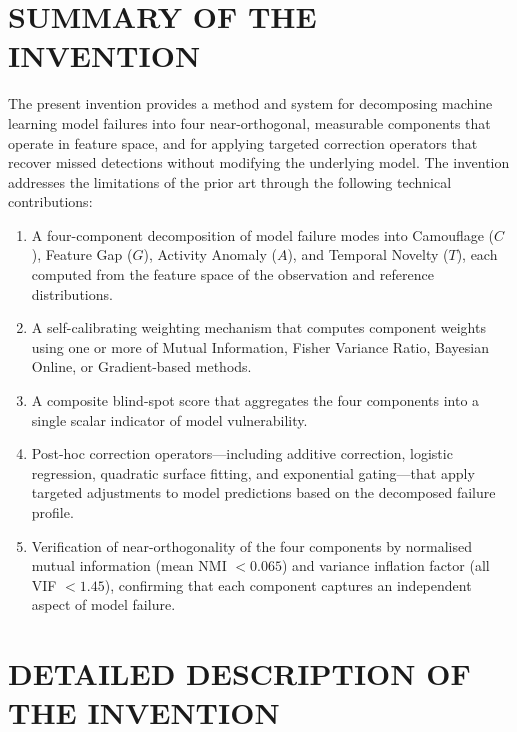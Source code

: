 \documentclass[12pt,a4paper]{article}
\begin{document}
\section{SUMMARY OF THE INVENTION}

The present invention provides a method and system for decomposing machine 
learning model failures into four near-orthogonal, measurable components 
that operate in feature space, and for applying targeted correction operators 
that recover missed detections without modifying the underlying model. The 
invention addresses the limitations of the prior art through the following 
technical contributions:

\begin{enumerate}[label=(\roman*)]
\item A four-component decomposition of model failure modes into 
Camouflage ($C$), Feature Gap ($G$), Activity Anomaly ($A$), and Temporal 
Novelty ($T$), each computed from the feature space of the observation and 
reference distributions.

\item A self-calibrating weighting mechanism that computes component weights 
using one or more of Mutual Information, Fisher Variance Ratio, Bayesian 
Online, or Gradient-based methods.

\item A composite blind-spot score that aggregates the four components into 
a single scalar indicator of model vulnerability.

\item Post-hoc correction operators---including additive correction, 
logistic regression, quadratic surface fitting, and exponential gating---that 
apply targeted adjustments to model predictions based on the decomposed 
failure profile.

\item Verification of near-orthogonality of the four components by 
normalised mutual information (mean NMI $< 0.065$) and variance inflation 
factor (all VIF $< 1.45$), confirming that each component captures an 
independent aspect of model failure.
\end{enumerate}

\section{DETAILED DESCRIPTION OF THE INVENTION}
\end{document}
